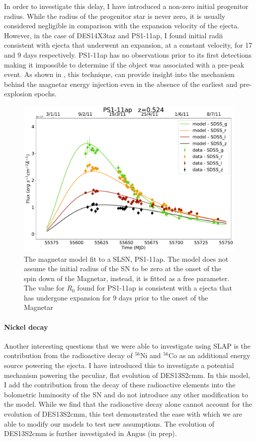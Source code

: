 In order to investigate this delay, I have introduced a non-zero initial progenitor radius. While the radius of the progenitor star is never zero, it is usually considered negligible in comparison with the expansion velocity of the ejecta. However, in the case of DES14X3taz and PS1-11ap, I found initial radii consistent with ejecta that underwent an expansion, at a constant velocity, for 17 and 9 days respectively. PS1-11ap has no observations prior to its first detections making it impossible to determine if the object was associated with a pre-peak event. As shown in , this technique, can provide insight into the mechanism behind the magnetar energy injection even in the absence of the earliest and pre-explosion epochs.

\begin{figure}
  \centering
  \includegraphics[width=\textwidth]{Figures/Chapter3/PS1-11ap}
  \caption{The magnetar model fit to a SLSN, PS1-11ap. The model does not assume the initial radius of the SN to be zero at the onset of the spin down of the Magnetar, instead, it is fitted as a free parameter. The value for $R_0$ found for PS1-11ap is consistent with a ejecta that has undergone expansion for 9 days prior to the onset of the Magnetar}
  \label{fig:PS1-11apR0}
\end{figure}

\paragraph{Nickel decay}
Another interesting questions that we were able to investigate using \textsc{SLAP} is the contribution from the radioactive decay of $^{56}$Ni and $^{56}$Co as an additional energy source powering the ejecta. I have introduced this to investigate a potential mechanism powering the peculiar, flat evolution of DES13S2cmm. In this model, I add the contribution from the decay of these radioactive elements into the bolometric luminosity of the SN and do not introduce any other modification to the model. While we find that the radioactive decay alone cannot account for the evolution of DES13S2cmm, this test demonstrated the ease with which we are able to modify our models to test new assumptions. The evolution of DES13S2cmm is further investigated in Angus (in prep).

